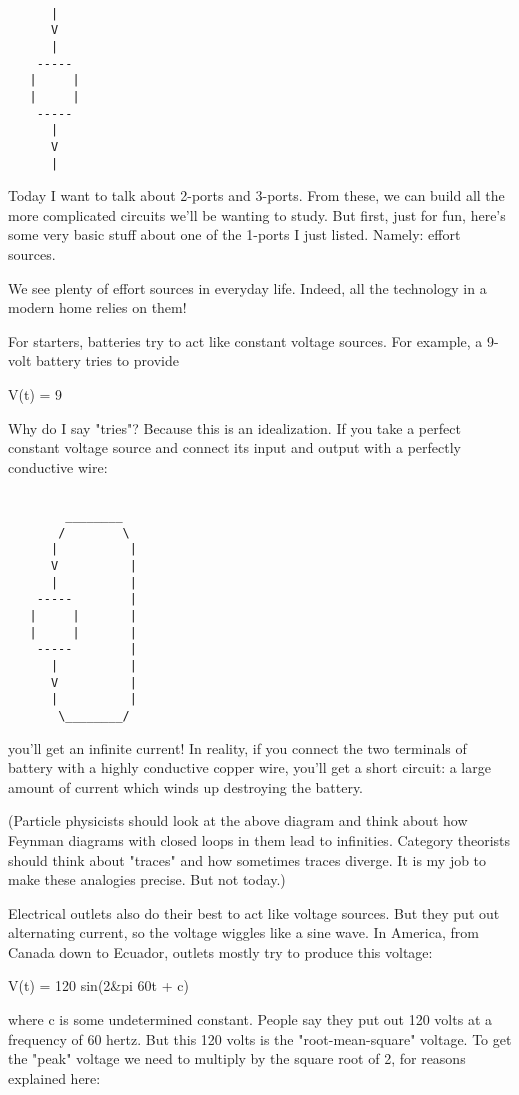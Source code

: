 \begin{verbatim}

      |
      V
      |
    -----
   |     |
   |     |
    -----
      |
      V
      |
\end{verbatim}
    

Today I want to talk about 2-ports and 3-ports.  From these, we can
build all the more complicated circuits we'll be wanting to study.
But first, just for fun, here's some very basic stuff about one of the
1-ports I just listed.  Namely: effort sources.

We see plenty of effort sources in everyday life.  Indeed, all the
technology in a modern home relies on them!  

For starters, batteries try to act like constant voltage sources.  For
example, a 9-volt battery tries to provide

V(t) = 9

Why do I say "tries"?  Because this is an idealization.  If
you take a perfect constant voltage source and connect its input and
output with a perfectly conductive wire:


\begin{verbatim}

        ________
       /        \
      |          |
      V          |
      |          |
    -----        |
   |     |       |
   |     |       |
    -----        |
      |          |
      V          |
      |          |
       \________/

\end{verbatim}
    
you'll get an infinite current!  In reality, if you connect the two
terminals of battery with a highly conductive copper wire, you'll get
a short circuit: a large amount of current which winds up destroying
the battery.

(Particle physicists should look at the above diagram and think about
how Feynman diagrams with closed loops in them lead to infinities.
Category theorists should think about "traces" and how sometimes
traces diverge.  It is my job to make these analogies precise.  But
not today.)

Electrical outlets also do their best to act like voltage sources.
But they put out alternating current, so the voltage wiggles like a
sine wave.  In America, from Canada down to Ecuador, outlets mostly
try to produce this voltage:

V(t) =  120 sin(2&pi 60t + c)
  
where c is some undetermined constant.  People say they put out 120
volts at a frequency of 60 hertz.  But this 120 volts is the
"root-mean-square" voltage.  To get the "peak"
voltage we need to multiply by the square root of 2, for reasons
explained here:

